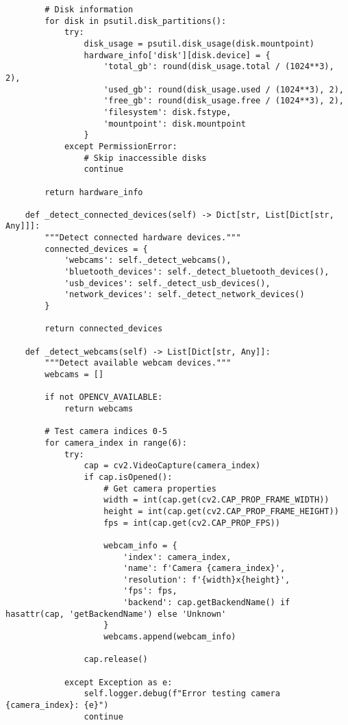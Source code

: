 \documentclass[11pt,a4paper]{article}
\begin{document}
\begin{verbatim}
        # Disk information
        for disk in psutil.disk_partitions():
            try:
                disk_usage = psutil.disk_usage(disk.mountpoint)
                hardware_info['disk'][disk.device] = {
                    'total_gb': round(disk_usage.total / (1024**3), 2),
                    'used_gb': round(disk_usage.used / (1024**3), 2),
                    'free_gb': round(disk_usage.free / (1024**3), 2),
                    'filesystem': disk.fstype,
                    'mountpoint': disk.mountpoint
                }
            except PermissionError:
                # Skip inaccessible disks
                continue

        return hardware_info

    def _detect_connected_devices(self) -> Dict[str, List[Dict[str, Any]]]:
        """Detect connected hardware devices."""
        connected_devices = {
            'webcams': self._detect_webcams(),
            'bluetooth_devices': self._detect_bluetooth_devices(),
            'usb_devices': self._detect_usb_devices(),
            'network_devices': self._detect_network_devices()
        }

        return connected_devices

    def _detect_webcams(self) -> List[Dict[str, Any]]:
        """Detect available webcam devices."""
        webcams = []

        if not OPENCV_AVAILABLE:
            return webcams

        # Test camera indices 0-5
        for camera_index in range(6):
            try:
                cap = cv2.VideoCapture(camera_index)
                if cap.isOpened():
                    # Get camera properties
                    width = int(cap.get(cv2.CAP_PROP_FRAME_WIDTH))
                    height = int(cap.get(cv2.CAP_PROP_FRAME_HEIGHT))
                    fps = int(cap.get(cv2.CAP_PROP_FPS))

                    webcam_info = {
                        'index': camera_index,
                        'name': f'Camera {camera_index}',
                        'resolution': f'{width}x{height}',
                        'fps': fps,
                        'backend': cap.getBackendName() if hasattr(cap, 'getBackendName') else 'Unknown'
                    }
                    webcams.append(webcam_info)

                cap.release()

            except Exception as e:
                self.logger.debug(f"Error testing camera {camera_index}: {e}")
                continue


\end{verbatim}
\end{document}
